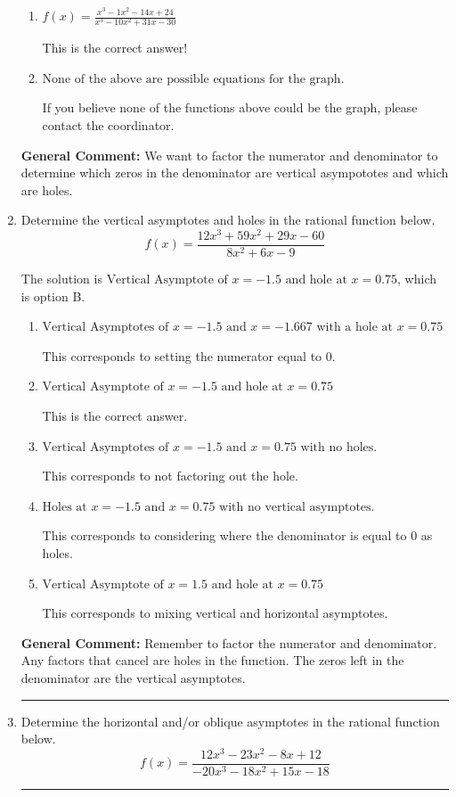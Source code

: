\documentclass{extbook}[14pt]
\newcommand{\litem}[1]{\item #1

\rule{\textwidth}{0.4pt}}
\begin{document}
\begin{enumerate}
{\begin{enumerate}[label=\Alph*.]
Remember that factors are written as $x-z$. For example, the zero $x=5$ corresponds to the factor $x-(5)$.
\item \( f(x)=\frac{x^{3} -1 x^{2} -14 x + 24}{x^{3} -10 x^{2} +31 x -30} \)

This is the correct answer!
\item \( \text{None of the above are possible equations for the graph.} \)

If you believe none of the functions above could be the graph, please contact the coordinator.
\end{enumerate}

\textbf{General Comment:} We want to factor the numerator and denominator to determine which zeros in the denominator are vertical asympototes and which are holes.
}
\litem{
Determine the vertical asymptotes and holes in the rational function below.
\[ f(x) = \frac{12x^{3} +59 x^{2} +29 x -60}{8x^{2} +6 x -9} \]

The solution is \( \text{Vertical Asymptote of } x = -1.5 \text{ and hole at } x = 0.75 \), which is option B.\begin{enumerate}[label=\Alph*.]
\item \( \text{Vertical Asymptotes of } x = -1.5 \text{ and } x = -1.667 \text{ with a hole at } x = 0.75 \)

This corresponds to setting the numerator equal to 0.
\item \( \text{Vertical Asymptote of } x = -1.5 \text{ and hole at } x = 0.75 \)

This is the correct answer.
\item \( \text{Vertical Asymptotes of } x = -1.5 \text{ and } x = 0.75 \text{ with no holes.} \)

This corresponds to not factoring out the hole.
\item \( \text{Holes at } x = -1.5 \text{ and } x = 0.75 \text{ with no vertical asymptotes.} \)

This corresponds to considering where the denominator is equal to 0 as holes.
\item \( \text{Vertical Asymptote of } x = 1.5 \text{ and hole at } x = 0.75 \)

This corresponds to mixing vertical and horizontal asymptotes.
\end{enumerate}

\textbf{General Comment:} Remember to factor the numerator and denominator. Any factors that cancel are holes in the function. The zeros left in the denominator are the vertical asymptotes.
}
\litem{
Determine the horizontal and/or oblique asymptotes in the rational function below.
\[ f(x) = \frac{12x^{3} -23 x^{2} -8 x + 12}{-20x^{3} -18 x^{2} +15 x -18} \]

}
\end{enumerate}
\end{document}
